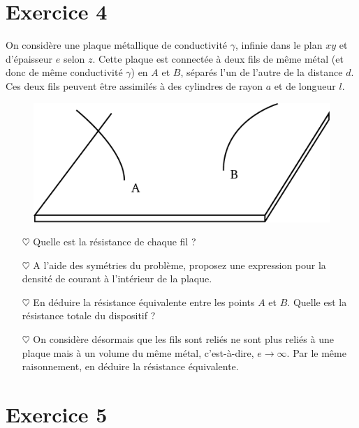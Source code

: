 \documentclass{report}
\begin{document}
\newpage

\section*{Exercice 4}

On considère une plaque métallique de conductivité $\gamma$, infinie dans le plan $xy$ et d'épaisseur $e$ selon $z$. Cette plaque est connectée à deux fils de même métal (et donc de même conductivité $\gamma$) en $A$ et $B$, séparés l'un de l'autre de la distance $d$. Ces deux fils peuvent être assimilés à des cylindres de rayon $a$ et de longueur $l$. 

\begin{figure}[h!]
\centering
		\includegraphics[scale=0.3]{plaque.pdf}
\end{figure}

\begin{itemize}

	\item[$\heartsuit$] Quelle est la résistance de chaque fil ? 
	
	\item[$\heartsuit$] A l'aide des symétries du problème, proposez une expression pour la densité de courant à l'intérieur de la plaque. 
	
	\item[$\heartsuit$] En déduire la résistance équivalente entre les points $A$ et $B$. Quelle est la résistance totale du dispositif ?
	
	\item[$\heartsuit$] On considère désormais que les fils sont reliés ne sont plus reliés à une plaque mais à un volume du même métal, c'est-à-dire, $e\longrightarrow\infty$. Par le même raisonnement, en déduire la résistance équivalente. 

\end{itemize}

\newpage

\section*{Exercice 5}
\end{document}
